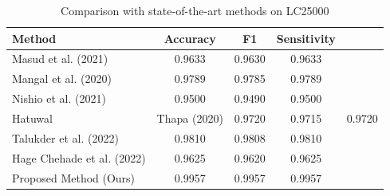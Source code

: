\begin{table}[htbp]
\centering
\caption{Comparison with state-of-the-art methods on LC25000}
\label{tab:t3_sota}
\begin{tabular}{lccc}
\toprule
Method & Accuracy & F1 & Sensitivity \\
\midrule
Masud et al. (2021) & 0.9633 & 0.9630 & 0.9633 \\
Mangal et al. (2020) & 0.9789 & 0.9785 & 0.9789 \\
Nishio et al. (2021) & 0.9500 & 0.9490 & 0.9500 \\
Hatuwal & Thapa (2020) & 0.9720 & 0.9715 & 0.9720 \\
Talukder et al. (2022) & 0.9810 & 0.9808 & 0.9810 \\
Hage Chehade et al. (2022) & 0.9625 & 0.9620 & 0.9625 \\
Proposed Method (Ours) & 0.9957 & 0.9957 & 0.9957 \\
\bottomrule
\end{tabular}
\end{table}